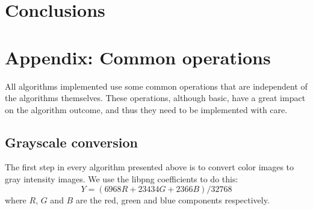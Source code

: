 \documentclass{ipol}
\numberwithin{equation}{section}
\numberwithin{table}{section}
\numberwithin{figure}{section}
\begin{document}



\section{Conclusions}
\label{sec:conclusions}


\section{Appendix: Common operations}
\label{sec:appendix1}

All algorithms implemented use some common operations that are independent of the algorithms themselves. 
These operations, although basic, have a great impact on the algorithm outcome, and thus they need to be 
implemented with care.\\

\subsection{Grayscale conversion}

The first step in every algorithm presented above is to convert color images to gray intensity images. 
We use the libpng coefficients to do this:
\begin{equation}
    Y = (6968 R + 23434 G + 2366 B) / 32768
\end{equation}
where $R$, $G$ and $B$ are the red, green and blue components respectively.\\
\end{document}
